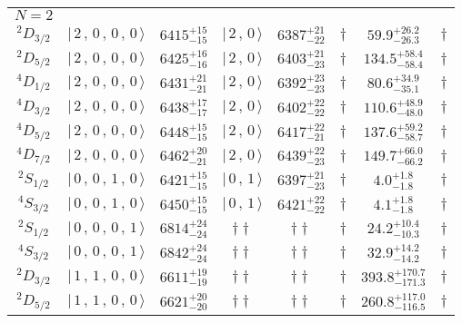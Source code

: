 \begin{tabular}{c| c c c c c c c}
\hline
 $N=2$  &  &  &  &  &  \\ 
$^{2}D_{3/2}$ & $\vert \,2\,,\,0\,,\,0\,,\,0 \,\rangle $ & $6415^{+15}_{-15}$ & $\vert \,2\,,\,0 \,\rangle$ & $6387^{+21}_{-22}$ & $\dagger$ & $59.9^{+26.2}_{-26.3}$ & $\dagger$ \\ 
$^{2}D_{5/2}$ & $\vert \,2\,,\,0\,,\,0\,,\,0 \,\rangle $ & $6425^{+16}_{-16}$ & $\vert \,2\,,\,0 \,\rangle$ & $6403^{+21}_{-23}$ & $\dagger$ & $134.5^{+58.4}_{-58.4}$ & $\dagger$ \\ 
$^{4}D_{1/2}$ & $\vert \,2\,,\,0\,,\,0\,,\,0 \,\rangle $ & $6431^{+21}_{-21}$ & $\vert \,2\,,\,0 \,\rangle$ & $6392^{+23}_{-23}$ & $\dagger$ & $80.6^{+34.9}_{-35.1}$ & $\dagger$ \\ 
$^{4}D_{3/2}$ & $\vert \,2\,,\,0\,,\,0\,,\,0 \,\rangle $ & $6438^{+17}_{-17}$ & $\vert \,2\,,\,0 \,\rangle$ & $6402^{+22}_{-22}$ & $\dagger$ & $110.6^{+48.9}_{-48.0}$ & $\dagger$ \\ 
$^{4}D_{5/2}$ & $\vert \,2\,,\,0\,,\,0\,,\,0 \,\rangle $ & $6448^{+15}_{-15}$ & $\vert \,2\,,\,0 \,\rangle$ & $6417^{+22}_{-21}$ & $\dagger$ & $137.6^{+59.2}_{-58.7}$ & $\dagger$ \\ 
$^{4}D_{7/2}$ & $\vert \,2\,,\,0\,,\,0\,,\,0 \,\rangle $ & $6462^{+20}_{-21}$ & $\vert \,2\,,\,0 \,\rangle$ & $6439^{+22}_{-23}$ & $\dagger$ & $149.7^{+66.0}_{-66.2}$ & $\dagger$ \\ 
$^{2}S_{1/2}$ & $\vert \,0\,,\,0\,,\,1\,,\,0 \,\rangle $ & $6421^{+15}_{-15}$ & $\vert \,0\,,\,1 \,\rangle$ & $6397^{+21}_{-23}$ & $\dagger$ & $4.0^{+1.8}_{-1.8}$ & $\dagger$ \\ 
$^{4}S_{3/2}$ & $\vert \,0\,,\,0\,,\,1\,,\,0 \,\rangle $ & $6450^{+15}_{-15}$ & $\vert \,0\,,\,1 \,\rangle$ & $6421^{+22}_{-22}$ & $\dagger$ & $4.1^{+1.8}_{-1.8}$ & $\dagger$ \\ 
$^{2}S_{1/2}$ & $\vert \,0\,,\,0\,,\,0\,,\,1 \,\rangle $ & $6814^{+24}_{-24}$ & $\dagger\dagger$ & $\dagger\dagger$ & $\dagger$ & $24.2^{+10.4}_{-10.3}$ & $\dagger$ \\ 
$^{4}S_{3/2}$ & $\vert \,0\,,\,0\,,\,0\,,\,1 \,\rangle $ & $6842^{+24}_{-24}$ & $\dagger\dagger$ & $\dagger\dagger$ & $\dagger$ & $32.9^{+14.2}_{-14.2}$ & $\dagger$ \\ 
$^{2}D_{3/2}$ & $\vert \,1\,,\,1\,,\,0\,,\,0 \,\rangle $ & $6611^{+19}_{-19}$ & $\dagger\dagger$ & $\dagger\dagger$ & $\dagger$ & $393.8^{+170.7}_{-171.3}$ & $\dagger$ \\ 
$^{2}D_{5/2}$ & $\vert \,1\,,\,1\,,\,0\,,\,0 \,\rangle $ & $6621^{+20}_{-20}$ & $\dagger\dagger$ & $\dagger\dagger$ & $\dagger$ & $260.8^{+117.0}_{-116.5}$ & $\dagger$ \\ 

\end{tabular}
